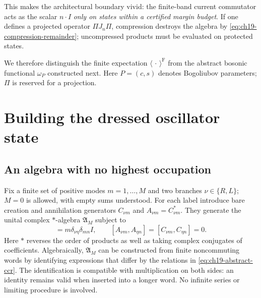 This makes the architectural boundary vivid: the finite-band current commutator acts as the
scalar $n\cdot I$ \emph{only on states within a certified margin budget}.  If one defines a
projected operator $\Pi J_n \Pi$, compression destroys the algebra by
\eqref{eq:ch19-compression-remainder}; uncompressed products must be evaluated on protected states.

We therefore distinguish the finite expectation
$\langle\,\cdot\,\rangle^{\mathrm F}$ from the abstract bosonic
functional $\omega_P$ constructed next.  Here $P=(c,s)$ denotes
Bogoliubov parameters; $\Pi$ is reserved for a projection.

\section{Building the dressed oscillator state}
\label{sec:ch19-oscillator-state}

\subsection*{An algebra with no highest occupation}

Fix a finite set of positive modes $m=1,\ldots,M$ and two branches
$\nu\in\{R,L\}$; $M=0$ is allowed, with empty sums understood.  For each
label introduce bare creation and annihilation generators $C_{\nu m}$
and $A_{\nu m}=C_{\nu m}^{*}$.  They generate the unital complex
$*$-algebra $\mathfrak A_M$ subject to
\begin{equation}
 [A_{\nu m},C_{\eta n}]
   =m\delta_{\nu\eta}\delta_{mn}I,
 \qquad [A_{\nu m},A_{\eta n}]
   =[C_{\nu m},C_{\eta n}]=0.
 \label{eq:ch19-abstract-ccr}
\end{equation}
Here $*$ reverses the order of products as well as taking complex
conjugates of coefficients.  Algebraically, $\mathfrak A_M$ can be
constructed from finite noncommuting words by identifying expressions
that differ by the relations in \eqref{eq:ch19-abstract-ccr}.  The
identification is compatible with multiplication on both sides: an
identity remains valid when inserted into a longer word.  No
infinite series or limiting procedure is involved.

